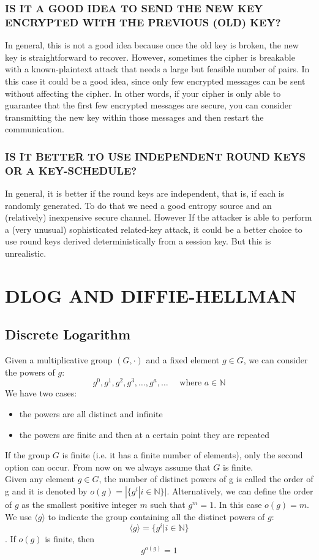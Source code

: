 \documentclass[a4paper, 10pt, titlepage]{article}
\begin{document}
\subsubsection*{IS IT A GOOD IDEA TO SEND THE NEW KEY ENCRYPTED WITH THE PREVIOUS (OLD) KEY?}
In general, this is not a good idea because once the old key is broken, the new key is straightforward to recover.
However, sometimes the cipher is breakable with a known-plaintext attack that needs a large but feasible number of pairs. In this case it could be a good idea, since only few encrypted messages can be sent without affecting the cipher. In other words, if your cipher is only able to guarantee that the first few encrypted messages are secure, you can consider transmitting the new key within those messages and then restart the communication.

\subsubsection*{IS IT BETTER TO USE INDEPENDENT ROUND KEYS OR A KEY-SCHEDULE?}
In general, it is better if the round keys are independent, that is, if each is randomly generated. To do that we need a good entropy source and an (relatively) inexpensive secure channel.
However If the attacker is able to perform a (very unusual) sophisticated related-key attack, it could be a better choice to use round keys derived deterministically from a session key. But this is unrealistic.

\newpage
\section{DLOG AND DIFFIE-HELLMAN}
\subsection{Discrete Logarithm}
Given a multiplicative group $(G , \cdot)$ and a fixed element $g \in G$, we can consider the powers of $g$:
$$g^0, g^1, g^2, g^3, \dots , g^a, \dots \quad \text{ where } a \in \mathbb{N}$$
We have two cases:
\begin{itemize}
\item the powers are all distinct and infinite
\item the powers are finite and then at a certain point they are repeated
\end{itemize}
If the group $G$ is finite (i.e. it has a finite number of elements), only the second option can occur. From now on we always assume that $G$ is finite. \\
Given any element $g \in G$, the number of distinct powers of g is called the order of g and it is denoted by $o(g) = |\{g^i | i \in \mathbb{N}\}|$.
Alternatively, we can define the order of $g$ as the smallest positive integer $m$ such that $g^m = 1$. In this case $o(g) = m$.
We use $\langle g \rangle$ to indicate the group containing all the distinct powers of $g$:
$$\langle g \rangle = \{g^i | i \in \mathbb{N}\}$$.
If $o(g)$ is finite, then 
$$g^{o(g)} = 1$$
\end{document}
